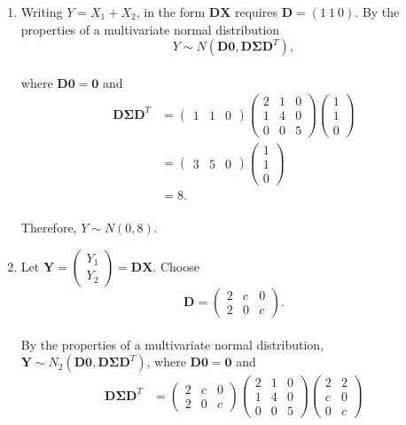 \documentclass[
]{book}
\providecommand{\tightlist}{%
  \setlength{\itemsep}{0pt}\setlength{\parskip}{0pt}}
\begin{document}
\begin{enumerate}
\def\labelenumi{(\alph{enumi})}
\tightlist
\item
  Writing \(Y = X_1+X_2\), in the form \(\mathbf{DX}\) requires \(\mathbf{D} = (1\ 1\ 0)\). By the properties of a multivariate normal distribution\\
  \[Y \sim N(\mathbf{D0}, \mathbf{D \Sigma D}^T),\]\\
  where \(\mathbf{D0}=\mathbf{0}\) and\\
  \begin{align*}
  \mathbf{D} \mathbf{\Sigma} \mathbf{D}^T &= \begin{pmatrix} 1 & 1 & 0 \end{pmatrix} \begin{pmatrix} 2 & 1 & 0 \\ 1 & 4 & 0 \\ 0 & 0 & 5 \end{pmatrix} \begin{pmatrix} 1 \\ 1 \\ 0 \end{pmatrix} \\
  &= \begin{pmatrix} 3 & 5 & 0 \end{pmatrix} \begin{pmatrix} 1 \\ 1 \\ 0 \end{pmatrix} \\
  &= 8.
  \end{align*}\\
  Therefore, \(Y \sim N(0,8)\).\\
\item
  Let \(\mathbf{Y} = \begin{pmatrix} Y_1 \\ Y_2 \end{pmatrix} = \mathbf{DX}\). Choose\\
  \[\mathbf{D} = \begin{pmatrix} 2 & c & 0 \\ 2 & 0 & c \end{pmatrix}.\]\\
  By the properties of a multivariate normal distribution, \(\mathbf{Y} \sim N_2(\mathbf{D0}, \mathbf{D \Sigma D}^T)\), where \(\mathbf{D0} = \mathbf{0}\) and\\
  \begin{align*}
  \mathbf{D \Sigma D}^T &= \begin{pmatrix} 2 & c & 0 \\ 2 & 0 & c \end{pmatrix} \begin{pmatrix} 2 & 1 & 0 \\ 1 & 4 & 0 \\ 0 & 0 & 5 \end{pmatrix} \begin{pmatrix} 2 & 2 \\ c & 0 \\ 0 & c \end{pmatrix} \\[3pt]

\end{align*}
\end{enumerate}
\end{document}

